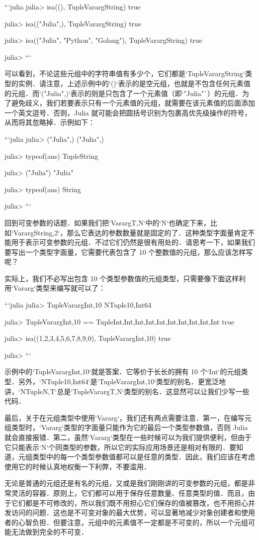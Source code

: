 ```julia
julia> isa((), Tuple{Vararg{String}})
true

julia> isa(("Julia",), Tuple{Vararg{String}})
true

julia> isa(("Julia", "Python", "Golang"), Tuple{Vararg{String}})
true

julia> 
```

可以看到，不论这些元组中的字符串值有多少个，它们都是`Tuple{Vararg{String}}`类型的实例．请注意，上述示例中的`()`表示的是空元组，也就是不包含任何元素值的元组．而`("Julia",)`表示的则是只包含了一个元素值（即`"Julia"`）的元组．为了避免歧义，我们若要表示只有一个元素值的元组，就需要在该元素值的后面添加一个英文逗号．否则，Julia 就可能会把圆括号识别为包裹高优先级操作的符号，从而将其忽略掉．示例如下：

```julia
julia> ("Julia",)
("Julia",)

julia> typeof(ans)
Tuple{String}

julia> ("Julia")
"Julia"

julia> typeof(ans)
String

julia> 
```

回到可变参数的话题．如果我们把`Vararg{T,N}`中的`N`也确定下来，比如`Vararg{String,2}`，那么它表达的参数数量就是固定的了．这种类型字面量肯定不能用于表示可变参数的元组．不过它们仍然是很有用处的．请思考一下，如果我们要写出一个类型字面量，它需要代表包含了 10 个整数值的元组，那么应该怎样写呢？

实际上，我们不必写出包含 10 个类型参数值的元组类型，只需要像下面这样利用`Vararg`类型来编写就可以了：

```julia
julia> Tuple{Vararg{Int,10}}
NTuple{10,Int64}

julia> Tuple{Vararg{Int,10}} == Tuple{Int,Int,Int,Int,Int,Int,Int,Int,Int,Int}
true

julia> isa((1,2,3,4,5,6,7,8,9,0), Tuple{Vararg{Int,10}})
true

julia> 
```

示例中的`Tuple{Vararg{Int,10}}`就是答案．它等价于长长的拥有 10 个`Int`的元组类型．另外，`NTuple{10,Int64}`是`Tuple{Vararg{Int,10}}`类型的别名．更宽泛地讲，`NTuple{N,T}`总是`Tuple{Vararg{T,N}}`类型的别名．这显然可以让我们少写一些代码．

最后，关于在元组类型中使用`Vararg`，我们还有两点需要注意．第一，在编写元组类型时，`Vararg`类型的字面量只能作为它的最后一个类型参数值，否则 Julia 就会直接报错．第二，虽然`Vararg`类型在一些时候可以为我们提供便利，但由于它只能表示`N`个同类型的参数，所以它的实际应用场景还是相对有限的．要知道，元组类型中的每一个类型参数值都可以是任意的类型．因此，我们应该在考虑使用它的时候认真地权衡一下利弊，不要滥用．

无论是普通的元组还是有名的元组，又或是我们刚刚讲的可变参数的元组，都是非常灵活的容器．原则上，它们都可以用于保存任意数量、任意类型的值．而且，由于它们都是不可修改的，所以我们既不用担心它们保存的值被篡改，也不用担心并发访问的问题．这也是不可变对象的最大优势，可以显著地减少对象创建者和使用者的心智负担．但要注意，元组中的元素值不一定都是不可变的，所以一个元组可能无法做到完全的不可变．